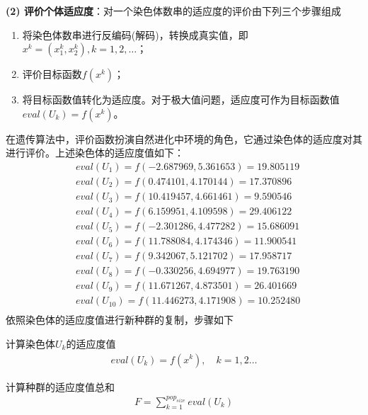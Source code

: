             \par
            \textbf{(2) 评价个体适应度}：对一个染色体数串的适应度的评价由下列三个步骤组成
            \begin{enumerate}
            \item 将染色体数串进行反编码(解码)，转换成真实值，即$x^k = (x_1^k,x_2^k),k=1,2,\dots$；
            \item 评价目标函数$f(x^k)$；
            \item 将目标函数值转化为适应度。对于极大值问题，适应度可作为目标函数值$eval(U_k) = f(x^k)$。
            \end{enumerate}
            \par
            在遗传算法中，评价函数扮演自然进化中环境的角色，它通过染色体的适应度对其进行评价。上述染色体的适应度值如下：
            \begin{align*}
            & eval(U_1) = f(-2.687969,5.361653) = 19.805119\\
            & eval(U_2) = f(0.474101,4.170144) = 17.370896\\
            & eval(U_3) = f(10.419457,4.661461) = 9.590546\\
            & eval(U_4) = f(6.159951,4.109598) = 29.406122\\
            & eval(U_5) = f(-2.301286,4.477282) = 15.686091\\
            & eval(U_6) = f(11.788084,4.174346) = 11.900541\\
            & eval(U_7) = f(9.342067,5.121702) = 17.958717\\
            & eval(U_8) = f(-0.330256,4.694977) = 19.763190\\
            & eval(U_9) = f(11.671267,4.873501) = 26.401669\\
            & eval(U_{10}) = f(11.446273,4.171908) = 10.252480\\
            \end{align*}
            依照染色体的适应度值进行新种群的复制，步骤如下
            \par
            计算染色体$U_k$的适应度值
            \begin{align*}
            eval(U_k) = f(x^k),\quad k=1,2\dots
            \end{align*}
            \par
            计算种群的适应度值总和
            \begin{align*}
            F = \sum_{k=1}^{pop_{size}} eval(U_k)
            \end{align*}
